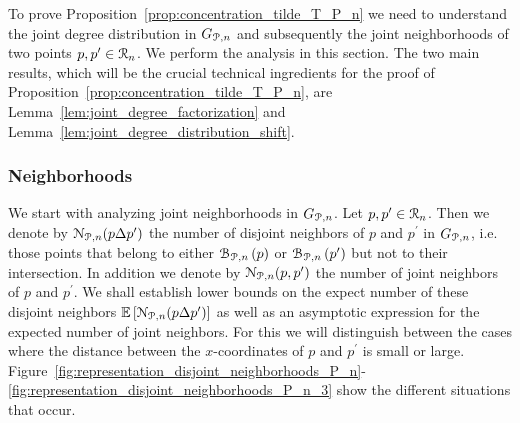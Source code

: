 To prove Proposition~\ref{prop:concentration_tilde_T_P_n} we need to understand the joint degree distribution in $G_{{\mathcal P},n}$ and subsequently the joint neighborhoods of two points $p, p^\prime \in {\mathcal R}_n$. We perform the analysis in this section. The two main results, which will be the crucial technical ingredients for the proof of Proposition~\ref{prop:concentration_tilde_T_P_n}, are Lemma~\ref{lem:joint_degree_factorization} and Lemma~\ref{lem:joint_degree_distribution_shift}.

\subsubsection*{Neighborhoods}

We start with analyzing joint neighborhoods in $G_{{\mathcal P},n}$. Let $p, p^\prime \in {\mathcal R}_n$. Then we denote by ${\mathcal N}_{{\mathcal P},n}(p\Delta p^\prime)$ the number of disjoint neighbors of $p$ and $p^\prime$ in $G_{{\mathcal P},n}$, i.e. those points that belong to either ${\mathcal B}_{{\mathcal P},n}\left(p\right)$ or ${\mathcal B}_{{\mathcal P},n}\left(p^\prime\right)$ but not to their intersection. In addition we denote by ${\mathcal N}_{{\mathcal P},n}(p,p^\prime)$ the number of joint neighbors of $p$ and $p^\prime$. We shall establish lower bounds on the expect number of these disjoint neighbors $\mathbb{E}\left[{\mathcal N}_{{\mathcal P},n}(p\Delta p^\prime)\right]$ as well as an asymptotic expression for the expected number of joint neighbors. For this we will distinguish between the cases where the distance between the $x$-coordinates of $p$ and $p^\prime$ is small or large. Figure~\ref{fig:representation_disjoint_neighborhoods_P_n}-\ref{fig:representation_disjoint_neighborhoods_P_n_3} show the different situations that occur.

